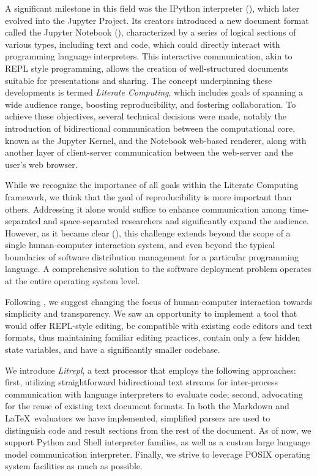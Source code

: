 \documentclass[letterpaper,12pt,twocolumn]{article}
\begin{document}
A significant milestone in this field was the IPython interpreter
(\textcite{Perez2007IPython}), which later evolved into the Jupyter Project. Its
creators introduced a new document format called the Jupyter Notebook
(\textcite{Kluyver2016jupnb}), characterized by a series of logical sections of
various types, including text and code, which could directly interact with
programming language interpreters. This interactive communication, akin to REPL
style programming, allows the creation of well-structured documents suitable for
presentations and sharing. The concept underpinning these developments is termed
\textit{Literate Computing}\cite{Perez2015blog}, which includes goals of
spanning a wide audience range, boosting reproducibility, and fostering
collaboration. To achieve these objectives, several technical decisions were
made, notably the introduction of bidirectional communication between the
computational core, known as the Jupyter Kernel, and the Notebook web-based
renderer, along with another layer of client-server communication between the
web-server and the user’s web browser.

While we recognize the importance of all goals within the Literate Computing
framework, we think that the goal of reproducibility is more important than
others. Addressing it alone would suffice to enhance communication among
time-separated and space-separated researchers and significantly expand the
audience. However, as it became clear (\textcite{Dolstra2010}), this challenge
extends beyond the scope of a single human-computer interaction system, and even
beyond the typical boundaries of software distribution management for a
particular programming language. A comprehensive solution to the software
deployment problem operates at the entire operating system level.

Following \textcite{Vallet2022}, we suggest changing the focus of human-computer
interaction towards simplicity and transparency. We saw an opportunity to
implement a tool that would offer REPL-style editing, be compatible with
existing code editors and text formats, thus maintaining familiar editing
practices, contain only a few hidden state variables, and have a significantly
smaller codebase.

We introduce \textit{Litrepl}, a text processor that employs the following
approaches: first, utilizing straightforward bidirectional text streams for
inter-process communication with language interpreters to evaluate code; second,
advocating for the reuse of existing text document formats. In both the Markdown
and \LaTeX\ evaluators we have implemented, simplified parsers are used to
distinguish code and result sections from the rest of the document. As of now,
we support Python and Shell interpreter families, as well as a custom large
language model communication interpreter. Finally, we strive to leverage
POSIX\cite{POSIX2024} operating system facilities as much as possible.
\end{document}
